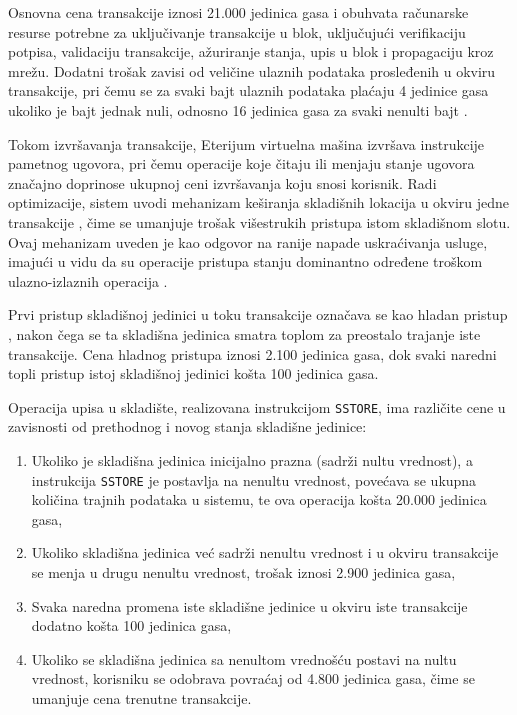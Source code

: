 Osnovna cena transakcije iznosi 21.000 jedinica gasa i obuhvata računarske resurse potrebne za uključivanje transakcije u blok, uključujući verifikaciju potpisa, validaciju transakcije, ažuriranje stanja, upis u blok i propagaciju kroz mrežu. Dodatni trošak zavisi od veličine ulaznih podataka prosleđenih u okviru transakcije, pri čemu se za svaki bajt ulaznih podataka plaćaju 4 jedinice gasa ukoliko je bajt jednak nuli, odnosno 16 jedinica gasa za svaki nenulti bajt \cite{CALLDATAeip2028}.

Tokom izvršavanja transakcije, Eterijum virtuelna mašina izvršava instrukcije pametnog ugovora, pri čemu operacije koje čitaju ili menjaju stanje ugovora značajno doprinose ukupnoj ceni izvršavanja koju snosi korisnik. Radi optimizacije, sistem uvodi mehanizam keširanja skladišnih lokacija u okviru jedne transakcije \cite{SSTOREeip2929}, čime se umanjuje trošak višestrukih pristupa istom skladišnom slotu. Ovaj mehanizam uveden je kao odgovor na ranije napade uskraćivanja usluge, imajući u vidu da su operacije pristupa stanju dominantno određene troškom ulazno-izlaznih operacija \cite{perez2019broken}.

Prvi pristup skladišnoj jedinici u toku transakcije označava se kao hladan pristup , nakon čega se ta skladišna jedinica smatra toplom  za preostalo trajanje iste transakcije. Cena hladnog pristupa iznosi 2.100 jedinica gasa, dok svaki naredni topli pristup istoj skladišnoj jedinici košta 100 jedinica gasa.

Operacija upisa u skladište, realizovana instrukcijom \texttt{SSTORE}, ima različite cene u zavisnosti od prethodnog i novog stanja skladišne jedinice:
\begin{enumerate}
\item Ukoliko je skladišna jedinica inicijalno prazna (sadrži nultu vrednost), a instrukcija \texttt{SSTORE} je postavlja na nenultu vrednost, povećava se ukupna količina trajnih podataka u sistemu, te ova operacija košta 20.000 jedinica gasa,
\item Ukoliko skladišna jedinica već sadrži nenultu vrednost i u okviru transakcije se menja u drugu nenultu vrednost, trošak iznosi 2.900 jedinica gasa,
\item Svaka naredna promena iste skladišne jedinice u okviru iste transakcije dodatno košta 100 jedinica gasa,
\item Ukoliko se skladišna jedinica sa nenultom vrednošću postavi na nultu vrednost, korisniku se odobrava povraćaj od 4.800 jedinica gasa, čime se umanjuje cena trenutne transakcije.
\end{enumerate}

